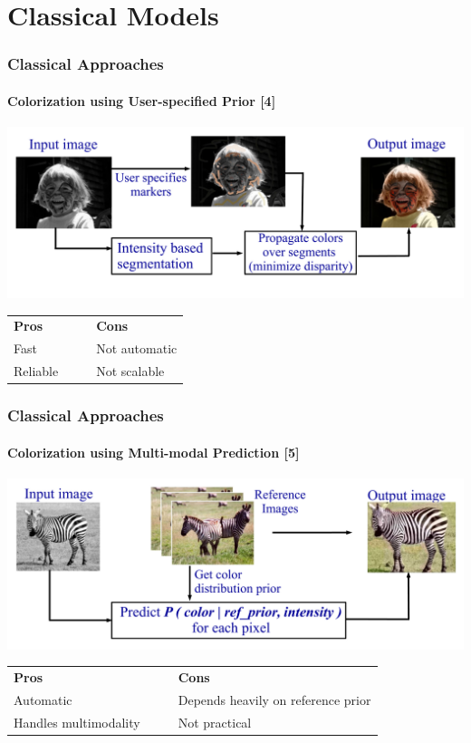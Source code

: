 \documentclass{beamer}
\begin{document}
\section*{Classical Models}
\begin{frame}
\frametitle{\textbf{Classical Approaches}}
\framesubtitle{\textbf{Colorization using User-specified Prior [4]}}
\includegraphics[width=\linewidth]{5.pdf}

\vspace{-3mm}
\begin{table}

\centering
\begin{tabular}{llll}
{\color{blue} \textbf{Pros}} & & & {\color{red} \textbf{Cons}} \\
Fast & & & Not automatic \\
Reliable & & & Not scalable

\end{tabular}
\end{table}

\end{frame}

\begin{frame}
\frametitle{\textbf{Classical Approaches}}
\framesubtitle{\textbf{Colorization using Multi-modal Prediction [5]}}
\includegraphics[width=\linewidth]{4.pdf}

\vspace{-5mm}
\begin{table}
\centering
\begin{tabular}{llll}
{\color{blue} \textbf{Pros}} & & & {\color{red} \textbf{Cons}} \\
Automatic & & & Depends heavily on reference prior  \\
Handles multimodality & & & Not practical

\end{tabular}
\end{table}

\end{frame}
\end{document}
